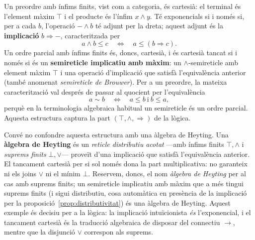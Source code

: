 \begin{exemple}\label{ex:preordres-ccc}
Un preordre amb ínfims finits, vist com a categoria, és cartesià: el terminal és l'element màxim $\top$ i el producte és l'ínfim $x\wedge y$. Té exponencials si i només si, per a cada $b$, l'operació $-\wedge b$ té adjunt per la dreta; aquest adjunt és la \textbf{implicació} $b\Rightarrow-$, caracteritzada per
\[
a\wedge b\leq c\quad\Longleftrightarrow\quad a\leq(b\Rightarrow c).
\]
Un ordre parcial amb ínfims finits és, doncs, cartesià, i és cartesià tancat si i només si és un \textbf{semireticle implicatiu amb màxim}: un $\wedge$-semireticle amb element màxim $\top$ i una operació d'implicació que satisfà l'equivalència anterior (també anomenat \emph{semireticle de Brouwer}). Per a un preordre, la mateixa caracterització val després de passar al quocient per l'equivalència
\[
a\sim b\quad\Longleftrightarrow\quad a\leq b\ \text{i}\ b\leq a,
\]
perquè en la terminologia algebraica habitual un semireticle és un ordre parcial. Aquesta estructura captura la part $(\top,\wedge,\Rightarrow)$ de la lògica.

Convé no confondre aquesta estructura amb una àlgebra de Heyting. Una \textbf{àlgebra de Heyting} és un \emph{reticle distributiu acotat} ---amb ínfims finits $\top,\wedge$ i \emph{suprems finits} $\bot,\vee$--- proveït d'una implicació que satisfà l'equivalència anterior. El tancament cartesià per si sol només dona la part multiplicativa: no garanteix ni els joins $\vee$ ni el mínim $\bot$. Reservem, doncs, el nom \emph{àlgebra de Heyting} per al cas amb suprems finits; un semireticle implicatiu amb màxim que a més tingui suprems finits (i sigui distributiu, cosa automàtica en presència de la implicació per la proposició~\ref{prop:distributivitat}) és una àlgebra de Heyting. Aquest exemple és decisiu per a la lògica: la implicació intuïcionista \emph{és} l'exponencial, i el tancament cartesià és la traducció algebraica de disposar del connectiu $\to$, mentre que la disjunció $\vee$ correspon als suprems.
\end{exemple}

